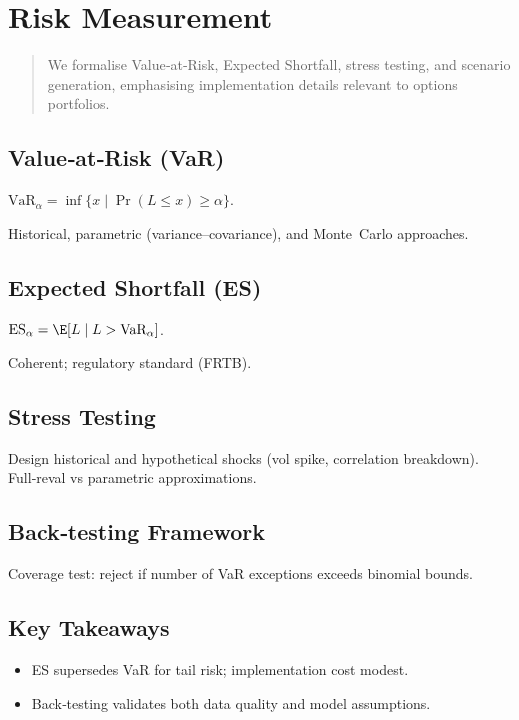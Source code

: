 \chapter{Risk Measurement}\label{ch:risk}

\begin{abstract}
We formalise Value‑at‑Risk, Expected Shortfall, stress testing, and
scenario generation, emphasising implementation details relevant to
options portfolios.
\end{abstract}

\section{Value‑at‑Risk (VaR)}

\(\text{VaR}_{\alpha} = \inf\{x\mid \Pr(L \le x)\ge \alpha\}\).

Historical, parametric (variance–covariance), and Monte Carlo approaches.

\section{Expected Shortfall (ES)}

\(\text{ES}_{\alpha} = \E[L \mid L > \text{VaR}_{\alpha}]\).

Coherent; regulatory standard (FRTB).

\section{Stress Testing}

Design historical and hypothetical shocks (vol spike, correlation
breakdown).  Full‑reval vs parametric approximations.

\section{Back‑testing Framework}

Coverage test:
reject if number of VaR exceptions exceeds binomial bounds.

\section*{Key Takeaways}
\begin{itemize}
  \item ES supersedes VaR for tail risk; implementation cost modest.
  \item Back‑testing validates both data quality and model assumptions.
\end{itemize}
